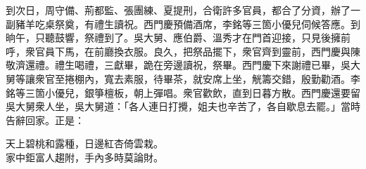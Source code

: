 到次日，周守備、荊都監、張團練、夏提刑，合衛許多官員，都合了分資，辦了一副豬羊吃桌祭奠，有禮生讀祝。西門慶預備酒席，李銘等三箇小優兒伺候答應。到晌午，只聽鼓響，祭禮到了。吳大舅、應伯爵、溫秀才在門首迎接，只見後擁前呼，衆官員下馬，在前廳換衣服。良久，把祭品擺下，衆官齊到靈前，西門慶與陳敬濟還禮。禮生喝禮，三獻畢，跪在旁邊讀祝，祭畢。西門慶下來謝禮已畢，吳大舅等讓衆官至捲棚內，寬去素服，待畢茶，就安席上坐，觥籌交錯，殷勤勸酒。李銘等三箇小優兒，銀箏檀板，朝上彈唱。衆官歡飲，直到日暮方散。西門慶還要留吳大舅衆人坐，吳大舅道：「各人連日打攪，姐夫也辛苦了，各自歇息去罷。」當時告辭回家。正是：

\begin{myquote} 
天上碧桃和露種，日邊紅杏倚雲栽。\\家中鉅富人趨附，手內多時莫論財。
\end{myquote} 

